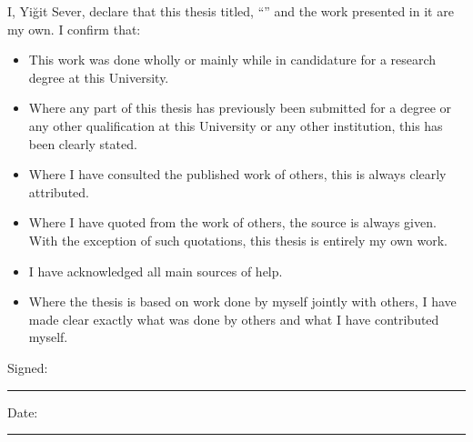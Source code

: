 \documentclass[
12pt, %
english, %
onehalfspacing, %
nolistspacing, %
parskip, %
nohyperref, %
headsepline, %
consistentlayout, %
]{MastersDoctoralThesis} %
\begin{document}
\begin{declaration}
\addchaptertocentry{\authorshipname} %
\noindent I, Yiğit Sever, declare that this thesis titled, \enquote{\ttitle} and the work presented in it are my own. I confirm that:

\begin{itemize}
\item This work was done wholly or mainly while in candidature for a research degree at this University.
\item Where any part of this thesis has previously been submitted for a degree or any other qualification at this University or any other institution, this has been clearly stated.
\item Where I have consulted the published work of others, this is always clearly attributed.
\item Where I have quoted from the work of others, the source is always given. With the exception of such quotations, this thesis is entirely my own work.
\item I have acknowledged all main sources of help.
\item Where the thesis is based on work done by myself jointly with others, I have made clear exactly what was done by others and what I have contributed myself.
\end{itemize}

\noindent Signed:\\
\rule[0.5em]{25em}{0.5pt} %

\noindent Date:\\
\rule[0.5em]{25em}{0.5pt} %
\end{declaration}





\end{document}
